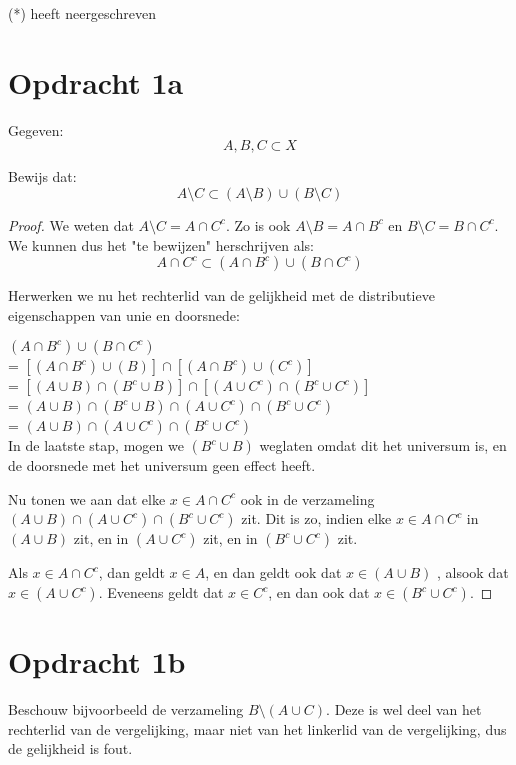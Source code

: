 \documentclass[hidequestions]{homework}
\begin{document}
(*) heeft neergeschreven

\section*{Opdracht 1a}

Gegeven: 
\[A,B,C \subset X\] 

Bewijs dat: 
\[A \setminus C \subset (A \setminus B) \cup (B \setminus C)
\] 

\begin{proof}

We weten dat $A \setminus C = A \cap C^c$. Zo is ook $A \setminus B = A \cap B^c$ en $B \setminus C = B \cap C^c$. We kunnen dus het "te bewijzen" herschrijven als: 
\[  A \cap C^c \subset (A \cap B^c) \cup (B \cap C^c)\] 

Herwerken we nu het rechterlid van de gelijkheid met de distributieve eigenschappen van unie en doorsnede: 

$(A \cap B^c) \cup (B \cap C^c)$\\
= $[(A \cap B^c) \cup (B )]  \cap   [(A \cap B^c) \cup (C^c)]$ \\
= $[(A \cup B) \cap (B^c \cup B )]   \cap   [  (A  \cup C^c) \cap (B^c \cup C^c)   ]$ \\
= $ (A \cup B) \cap (B^c \cup B ) \cap  (A \cup C^c) \cap (B^c \cup C^c) $ \\
= $ (A \cup B) \cap  (A \cup C^c) \cap (B^c \cup C^c) $ \\
In de laatste stap, mogen we $(B^c \cup B )$ weglaten omdat dit het universum is, en de doorsnede met het universum geen effect heeft. 

Nu tonen we aan dat  elke $x \in A \cap C^c$ ook in de verzameling $ (A \cup B) \cap  (A \cup C^c) \cap (B^c \cup C^c) $ zit. Dit is zo, indien elke 
$x \in A \cap C^c$ in $ (A \cup B)$ zit, en in $ (A \cup C^c) $ zit, en in $ (B^c \cup C^c) $ zit. 

Als $x \in A \cap C^c$, dan geldt $x \in A$, en dan geldt ook dat $x \in (A \cup B)$ , alsook dat $x \in (A \cup C^c)$.
Eveneens geldt dat $x \in C^c$, en dan ook dat $x \in (B^c \cup C^c) $. 

\end{proof}


\section*{Opdracht 1b}

Beschouw bijvoorbeeld de verzameling $B \setminus (A \cup C)$. Deze is wel deel van het rechterlid van de vergelijking, maar niet van het linkerlid van de vergelijking, dus de gelijkheid is fout. 
\end{document}
